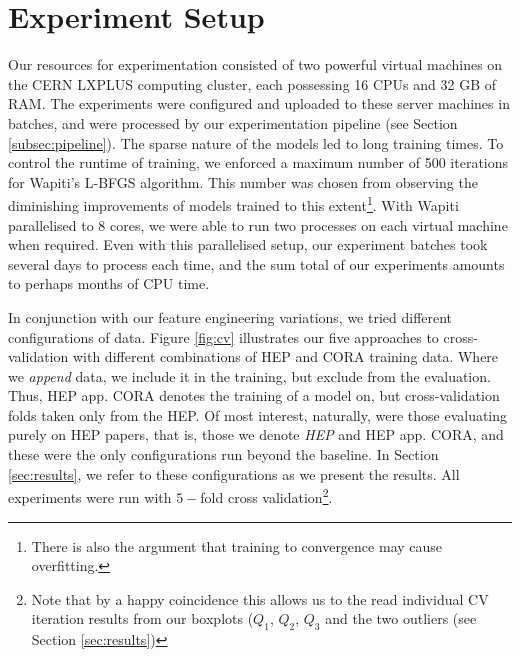 \section{Experiment Setup}
\label{sec:experimentsetup}

Our resources for experimentation consisted of two powerful virtual machines on the CERN LXPLUS computing cluster, each possessing 16 CPUs and 32 GB of RAM. The experiments were configured and uploaded to these server machines in batches, and were processed by our experimentation pipeline (see Section \ref{subsec:pipeline}). The sparse nature of the models led to long training times. To control the runtime of training, we enforced a maximum number of 500 iterations for Wapiti's L-BFGS algorithm. This number was chosen from observing the diminishing improvements of models trained to this extent\footnote{There is also the argument that training to convergence may cause overfitting.}. With Wapiti parallelised to 8 cores, we were able to run two processes on each virtual machine when required. Even with this parallelised setup, our experiment batches took several days to process each time, and the sum total of our experiments amounts to perhaps months of CPU time.

In conjunction with our feature engineering variations, we tried different configurations of data. Figure \ref{fig:cv} illustrates our five approaches to cross-validation with different combinations of HEP and CORA training data. Where we \emph{append} data, we include it in the training, but exclude from the evaluation. Thus, HEP app. CORA denotes the training of a model on, but cross-validation folds taken only from the HEP. Of most interest, naturally, were those evaluating purely on HEP papers, that is, those we denote \emph{HEP} and {HEP app. CORA}, and these were the only configurations run beyond the baseline. In Section \ref{sec:results}, we refer to these configurations as we present the results. All experiments were run with $5-$fold cross validation\footnote{Note that by a happy coincidence this allows us to the read individual CV iteration results from our boxplots ($Q_1$, $Q_2$, $Q_3$ and the two outliers (see Section \ref{sec:results})}.

